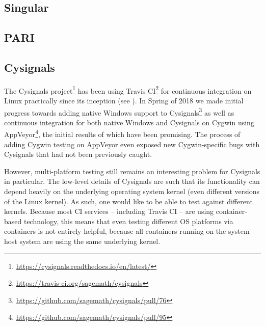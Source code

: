 \documentclass{deliverablereport}
\begin{document}




\subsection{Singular}



\subsection{PARI}


\subsection{Cysignals}

The Cysignals
project\footnote{\url{https://cysignals.readthedocs.io/en/latest/}} has been
using Travis CI\footnote{\url{https://travis-ci.org/sagemath/cysignals}} for
continuous integration on Linux practically since its inception (see ).  In Spring of 2018 we made
initial progress towards adding native Windows support to
Cysignals\footnote{\url{https://github.com/sagemath/cysignals/pull/76}} as well
as continuous integration for both native Windows and Cysignals on Cygwin using
AppVeyor\footnote{\url{https://github.com/sagemath/cysignals/pull/95}}, the
initial results of which have been promising.  The process of adding Cygwin
testing on AppVeyor even exposed new Cygwin-specific bugs with Cysignals that
had not been previously caught.

However, multi-platform testing still remains an interesting problem for
Cysignals in particular.  The low-level details of Cysignals are such that its
functionality can depend heavily on the underlying operating system kernel
(even different versions of the Linux kernel).  As such, one would like to be
able to test against different kernels.  Because most CI services -- including
Travis CI -- are using container-based technology, this means that even testing
different OS platforms via containers is not entirely helpful, because all
containers running on the system host system are using the same underlying
kernel.
\end{document}
